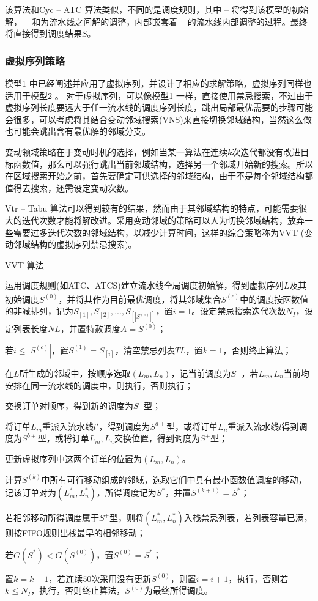 该算法和Cyc -- ATC 算法类似，不同的是调度规则，其中 -- 将得到该模型的初始解， -- 和为流水线之间解的调整，内部嵌套着 -- 的流水线内部调整的过程。最终将直接得到调度结果$S$。

\subsubsection{虚拟序列策略}
模型1 中已经阐述并应用了虚拟序列，并设计了相应的求解策略，虚拟序列同样也适用于模型2 。
对于虚拟序列，可以像模型1 一样，直接使用禁忌搜索，不过由于虚拟序列长度要远大于任一流水线的调度序列长度，跳出局部最优需要的步骤可能会很多，可以考虑将其结合变动邻域搜索(VNS)来直接切换邻域结构，当然这么做也可能会跳出含有最优解的邻域分支。

变动领域策略在于变动时机的选择，例如当某一算法在连续$k$次迭代都没有改进目标函数值，那么可以强行跳出当前邻域结构，选择另一个邻域开始新的搜索。所以在区域搜索开始之前，首先要确定可供选择的邻域结构，由于不是每个邻域结构都值得去搜索，还需设定变动次数。

Vtr -- Tabu 算法可以得到较有的结果，然而由于其邻域结构的特点，可能需要很大的迭代次数才能将解改进。采用变动邻域的策略可以人为切换邻域结构，放弃一些需要过多迭代次数的邻域结构，以减少计算时间，这样的综合策略称为VVT (变动邻域结构的虚拟序列禁忌搜索)。
\begin{algori}
VVT 算法\label{alg:vvt}
\begin{asparaenum}
\renewcommand{\labelenumi}{\bf Step\theenumi~}
\item 运用调度规则(如ATC、ATCS)建立流水线全局调度初始解，得到虚拟序列$L$及其初始调度$S^{(0)}$，并将其作为目前最优调度，将其邻域集合$\overline{S^{(c)}}$中的调度按函数值的非减排列，记为$S_{[1]},S_{[2]},...,S_{[|S^{(c)}|]}$，置$i = 1$。设定禁忌搜索迭代次数$N_I$，设定列表长度$NL$，并置特赦调度$A = S^{(0)}$；
\item 若$i \le |S^{(c)}|$，置$S^{(1)} = S_{[i]}$，清空禁忌列表$TL$，置$k = 1$，否则终止算法；
\item 在$L$所生成的邻域中，按顺序选取$(L_m, L_n)$，记当前调度为$S^-$，若$L_m, L_n$当前均安排在同一流水线的调度中，则执行，否则执行；
\item 交换订单对顺序，得到新的调度为$S^+$型；
\item 将订单$L_m$重派入流水线$l'$，得到调度为$S^{a+}$型，或将订单$L_n$重派入流水线$l$得到调度为$S^{b+}$型，或将订单$L_m, L_n$交换位置，得到调度为$S^+$型；
\item 更新虚拟序列中这两个订单的位置为$(L_m, L_n)$。
\item 计算$S^{(k)}$中所有可行移动组成的邻域，选取它们中具有最小函数值调度的移动，记该订单对为$(L_m^*, L_n^*)$，所得调度记为$S^*$，并置$S^{(k+1)} = S^*$；
\item 若相邻移动所得调度属于$S^+$型，则将$(L_m^*, L_n^*)$入栈禁忌列表，若列表容量已满，则按FIFO规则出栈最早的相邻移动；
\item 若$G(S^*) < G(S^{(0)})$，置$S^{(0)} = S^*$；
\item 置$k = k + 1$，若连续$50$次采用没有更新$S^{(0)}$，则置$i = i+1$，执行，否则若$k\le N_I$，执行，否则终止算法，$S^{(0)}$为最终所得调度。
\end{asparaenum}
\end{algori}

